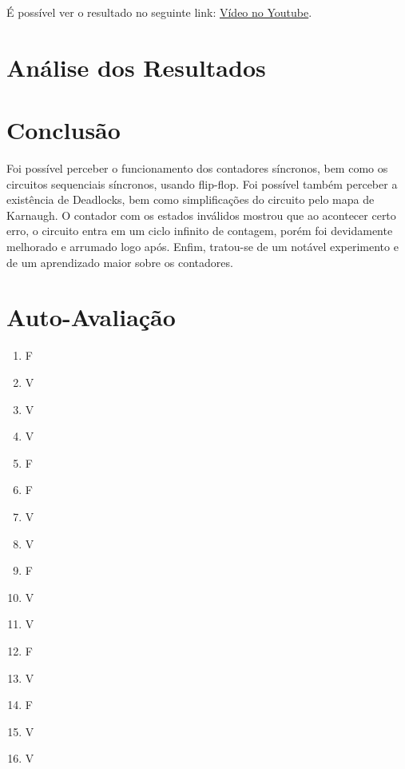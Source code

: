 \documentclass[12pt]{article}
\begin{document}
		É possível ver o resultado no seguinte link: \href{https://youtu.be/lQTI5OIwBo0}{Vídeo no Youtube}.
		
		
	
	\section{Análise dos Resultados}
	\label{sec:Resultados}
	
	
	
	\section{Conclusão}
	\label{sec:Conclusao}
	
	Foi possível perceber o funcionamento dos contadores síncronos, bem como os circuitos sequenciais síncronos, usando flip-flop. Foi possível também perceber a existência de Deadlocks, bem como simplificações do circuito pelo mapa de Karnaugh. O contador com os estados inválidos mostrou que ao acontecer certo erro, o circuito entra em um ciclo infinito de contagem, porém foi devidamente melhorado e arrumado logo após. Enfim, tratou-se de um notável experimento e de um aprendizado maior sobre os contadores.
	
	\newpage 
	\section*{Auto-Avaliação}
	
	\begin{enumerate}
		\item F
		\item V
		\item V
		\item V
		\item F
		\item F
		\item V
		\item V
		\item F
		\item V
		\item V
		\item F
		\item V
		\item F
		\item V
		\item V
		
	\end{enumerate}
	
	
\end{document}
